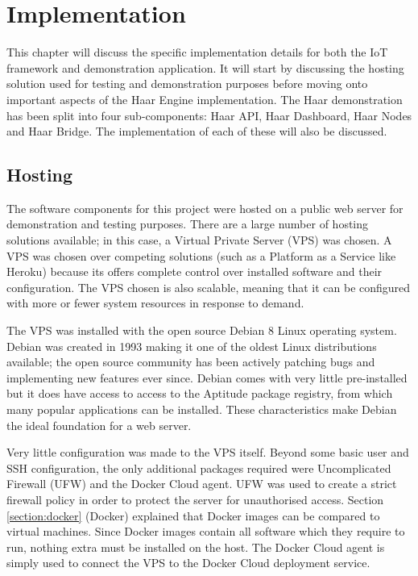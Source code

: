 \chapter{Implementation}
\label{chapter:implementation}
  This chapter will discuss the specific implementation details for both the IoT framework and demonstration application. It will start by discussing the hosting solution used for testing and demonstration purposes before moving onto important aspects of the Haar Engine implementation. The Haar demonstration has been split into four sub-components: Haar API, Haar Dashboard, Haar Nodes and Haar Bridge. The implementation of each of these will also be discussed.

  \section{Hosting}
    The software components for this project were hosted on a public web server for demonstration and testing purposes. There are a large number of hosting solutions available; in this case, a Virtual Private Server (VPS) was chosen. A VPS was chosen over competing solutions (such as a Platform as a Service like Heroku) because its offers complete control over installed software and their configuration. The VPS chosen is also scalable, meaning that it can be configured with more or fewer system resources in response to demand.

    The VPS was installed with the open source Debian 8 Linux operating system. Debian was created in 1993 making it one of the oldest Linux distributions available; the open source community has been actively patching bugs and implementing new features ever since. Debian comes with very little pre-installed but it does have access to access to the Aptitude package registry, from which many popular applications can be installed. These characteristics make Debian the ideal foundation for a web server.

    Very little configuration was made to the VPS itself. Beyond some basic user and SSH configuration, the only additional packages required were Uncomplicated Firewall (UFW) and the Docker Cloud agent. UFW was used to create a strict firewall policy in order to protect the server for unauthorised access. Section \ref{section:docker} (Docker) explained that Docker images can be compared to virtual machines. Since Docker images contain all software which they require to run, nothing extra must be installed on the host. The Docker Cloud agent is simply used to connect the VPS to the Docker Cloud deployment service.

